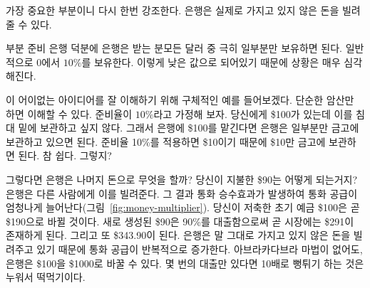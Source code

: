 \begin{comment}
	Let me repeat the most important part: banks can lend money that they
	don't actually have.
\end{comment}
가장 중요한 부분이니 다시 한번 강조한다.
은행은 실제로 가지고 있지 않은 돈을 빌려줄 수 있다.

\begin{comment}
	Thanks to fractional reserve banking, a bank only has to keep a small
	\textit{fraction} of every dollar it gets. It's somewhere between $0$ and $10\%$,
	usually at the lower end, which makes things even worse.
\end{comment}
부분 준비 은행 덕분에 은행은 받는 분모든 달러 중 극히 일부분만 보유하면 된다. 
일반적으로 $0$에서 $10\%$를 보유한다. 
이렇게 낮은 값으로 되어있기 때문에 상황은 매우 심각해진다.

\begin{comment}
	Let's use a concrete example to better understand this crazy idea: A
	fraction of $10\%$ will do the trick and we should be able to do all the
	calculations in our head. Win-win. So, if you take \$100 to a
	bank --- because you don't want to store it under your mattress --- they
	only have to keep the agreed upon \textit{fraction} of it. In our example that
	would be \$10, because 10\% of \$100 is \$10. Easy, right?
\end{comment}
이 어이없는 아이디어를 잘 이해하기 위해 구체적인 예를 들어보겠다. 
단순한 암산만 하면 이해할 수 있다. 
준비율이 $10\%$라고 가정해 보자.
당신에게  \$100가 있는데 이를 침대 밑에 보관하고 싶지 않다.
그래서 은행에 \$100를 맡긴다면 은행은 일부분만 금고에 보관하고 있으면 된다.
준비율 10\%를 적용하면 \$10이기 때문에 \$10만 금고에 보관하면 된다. 
참 쉽다. 그렇지? 

\begin{comment}
	So what do banks do with the rest of the money? What happens to your \$90? They
	do what banks do, they lend it to other people. The result is a money multiplier
	effect, which increases the money supply in the economy enormously
	(Figure~\ref{fig:money-multiplier}). Your initial deposit of \$100 will soon
	turn into \$190. By lending a 90\% fraction of the newly created \$90, there
	will soon be \$271 in the economy. And \$343.90 after that. The money supply is
	recursively increasing, since banks are literally lending money they don't
	have~\cite{wiki:money-multiplier}. Without a single Abracadabra, banks magically
	transform \$100 into one thousand dollars or more. Turns out 10x is easy. It
	only takes a couple of lending rounds.
\end{comment}
그렇다면 은행은 나머지 돈으로 무엇을 할까? 
당신이 지불한 \$90는 어떻게 되는거지? 
은행은 다른 사람에게 이를 빌려준다. 
그 결과 통화 승수효과가 발생하여 통화 공급이 엄청나게 늘어난다(그림~\ref{fig:money-multiplier}). 
당신이 저축한 초기 예금 \$100은 곧 \$190으로 바뀔 것이다. 
새로 생성된 \$90은 90\%를 대출함으로써 곧 시장에는 \$291이 존재하게 된다. 
그리고 또 \$343.90이 된다. 
은행은 말 그대로 가지고 있지 않은 돈을 빌려주고 있기 때문에 통화 공급이 반복적으로 증가한다\cite{wiki:money-multiplier}. 
아브라카다브라 마법이 없어도, 은행은 \$100을 \$1000로 바꿀 수 있다. 
몇 번의 대출만 있다면 10배로 뻥튀기 하는 것은 누워서 떡먹기이다.


